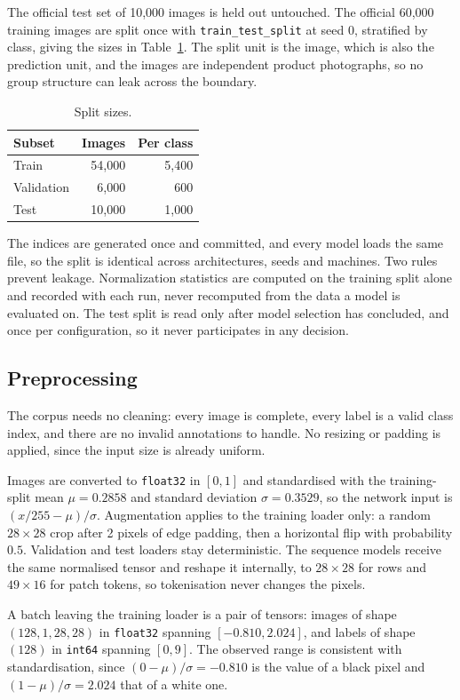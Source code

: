The official test set of 10{,}000 images is held out untouched. The official 60{,}000 training
images are split once with \texttt{train\_test\_split} at seed $0$, stratified by class, giving
the sizes in Table~\ref{tab:splits}. The split unit is the image, which is also the prediction
unit, and the images are independent product photographs, so no group structure can leak across
the boundary.

\begin{table}[H]
\centering
\caption{Split sizes.}
\label{tab:splits}
\begin{tabular}{lrr}
\hline
\textbf{Subset} & \textbf{Images} & \textbf{Per class} \\
\hline
Train      & 54{,}000 & 5{,}400 \\
Validation &  6{,}000 &   600 \\
Test       & 10{,}000 & 1{,}000 \\
\hline
\end{tabular}
\end{table}

The indices are generated once and committed, and every model loads the same file, so the split
is identical across architectures, seeds and machines. Two rules prevent leakage. Normalization
statistics are computed on the training split alone and recorded with each run, never recomputed
from the data a model is evaluated on. The test split is read only after model selection has
concluded, and once per configuration, so it never participates in any decision.

\subsection{Preprocessing}
\label{subsec:problem-and-data-5}

The corpus needs no cleaning: every image is complete, every label is a valid class index, and
there are no invalid annotations to handle. No resizing or padding is applied, since the input
size is already uniform.

Images are converted to \texttt{float32} in $[0, 1]$ and standardised with the training-split
mean $\mu = 0.2858$ and standard deviation $\sigma = 0.3529$, so the network input is
$(x/255 - \mu)/\sigma$. Augmentation applies to the training loader only: a random
$28 \times 28$ crop after 2 pixels of edge padding, then a horizontal flip with probability
$0.5$. Validation and test loaders stay deterministic. The sequence models receive the same
normalised tensor and reshape it internally, to $28 \times 28$ for rows and $49 \times 16$ for
patch tokens, so tokenisation never changes the pixels.

A batch leaving the training loader is a pair of tensors: images of shape
$(128, 1, 28, 28)$ in \texttt{float32} spanning $[-0.810, 2.024]$, and labels of shape $(128)$ in
\texttt{int64} spanning $[0, 9]$. The observed range is consistent with standardisation, since
$(0 - \mu)/\sigma = -0.810$ is the value of a black pixel and $(1 - \mu)/\sigma = 2.024$ that of
a white one.
